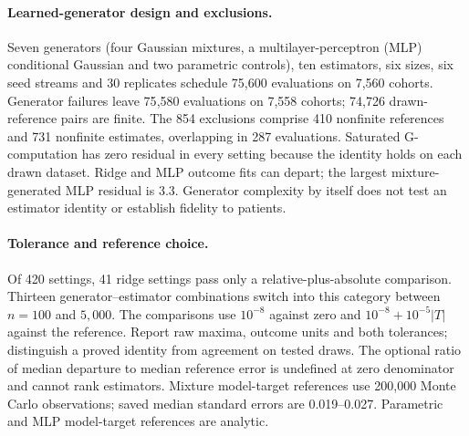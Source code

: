 \paragraph{Learned-generator design and exclusions.}\label{analysis:app:learned}
Seven generators (four Gaussian mixtures, a multilayer-perceptron (MLP)
conditional Gaussian and two
parametric controls), ten estimators, six sizes, six seed streams and 30
replicates schedule 75{,}600 evaluations on 7{,}560 cohorts. Generator failures
leave 75{,}580 evaluations on 7{,}558 cohorts; 74{,}726 drawn-reference pairs
are finite. The 854 exclusions comprise 410 nonfinite references and 731
nonfinite estimates, overlapping in 287 evaluations. Saturated G-computation
has zero residual in every setting because the identity holds on each drawn
dataset. Ridge and MLP outcome fits can depart; the largest mixture-generated
MLP residual is 3.3. Generator complexity by itself does not test an estimator
identity or establish fidelity to patients.

\paragraph{Tolerance and reference choice.}\label{analysis:app:scale}
Of 420 settings, 41 ridge settings pass only a relative-plus-absolute comparison.
Thirteen generator--estimator combinations switch into this category between
$n=100$ and $5{,}000$. The comparisons use $10^{-8}$ against zero and
$10^{-8}+10^{-5}|T|$ against the reference. Report raw maxima, outcome units
and both tolerances; distinguish a proved identity from agreement on tested
draws. The optional ratio of median departure to median reference error is
undefined at zero denominator and cannot rank estimators. Mixture model-target
references use 200{,}000 Monte Carlo observations; saved median standard
errors are 0.019--0.027. Parametric and MLP model-target references are analytic.
